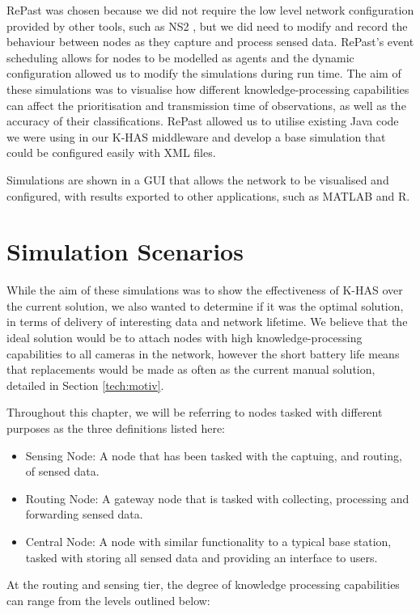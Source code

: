 RePast was chosen because we did not require the low level network configuration provided by other tools, such as NS2 \cite{mccanne1997network}, but we did need to modify and record the behaviour between nodes as they capture and process sensed data. RePast's event scheduling allows for nodes to be modelled as agents and the dynamic configuration allowed us to modify the simulations during run time. The aim of these simulations was to visualise how different knowledge-processing capabilities can affect the prioritisation and transmission time of observations, as well as the accuracy of their classifications. RePast allowed us to utilise existing Java code we were using in our K-HAS middleware and develop a base simulation that could be configured easily with XML files.

Simulations are shown in a GUI that allows the network to be visualised and configured, with results exported to other applications, such as MATLAB and R.

\section{Simulation Scenarios}\label{sim:scen}
While the aim of these simulations was to show the effectiveness of K-HAS over the current solution, we also wanted to determine if it was the optimal solution, in terms of delivery of interesting data and network lifetime. We believe that the ideal solution would be to attach nodes with high knowledge-processing capabilities to all cameras in the network, however the short battery life means that replacements would be made as often as the current manual solution, detailed in Section \ref{tech:motiv}.

Throughout this chapter, we will be referring to nodes tasked with different purposes as the three definitions listed here:
	\begin{itemize}
		\item Sensing Node: A node that has been tasked with the captuing, and routing, of sensed data.
		\item Routing Node: A gateway node that is tasked with collecting, processing and forwarding sensed data.
		\item Central Node: A node with similar functionality to a typical base station, tasked with storing all sensed data and providing an interface to users.
	\end{itemize}

At the routing and sensing tier, the degree of knowledge processing capabilities can range from the levels outlined below:

